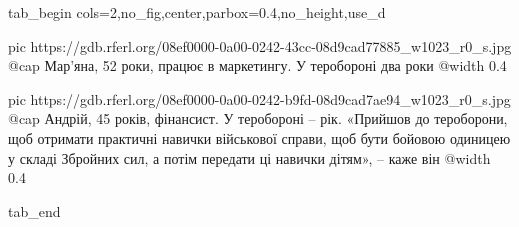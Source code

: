  
 
 
 
 


\ifcmt
  tab_begin cols=2,no_fig,center,parbox=0.4,no_height,use_d

     pic https://gdb.rferl.org/08ef0000-0a00-0242-43cc-08d9cad77885_w1023_r0_s.jpg
		 @cap Мар’яна, 52 роки, працює в маркетингу. У теробороні два роки
		 @width 0.4

		 pic https://gdb.rferl.org/08ef0000-0a00-0242-b9fd-08d9cad7ae94_w1023_r0_s.jpg
		 @cap Андрій, 45 років, фінансист. У теробороні – рік. «Прийшов до тероборони, щоб отримати практичні навички військової справи, щоб бути бойовою одиницею у складі Збройних сил, а потім передати ці навички дітям», – каже він
		 @width 0.4

  tab_end
\fi
